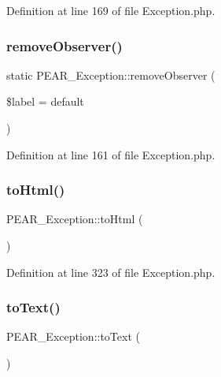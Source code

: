 Definition at line 169 of file Exception.\+php.

\mbox{\label{classPEAR__Exception_ac5a5c181030c19d81f280ab8190b5909}} 
\subsubsection{\texorpdfstring{remove\+Observer()}{removeObserver()}}
{\footnotesize\ttfamily static P\+E\+A\+R\+\_\+\+Exception\+::remove\+Observer (\begin{DoxyParamCaption}\item[{}]{\$label = {\ttfamily \textquotesingle{}default\textquotesingle{}} }\end{DoxyParamCaption})\hspace{0.3cm}{\ttfamily [static]}}



Definition at line 161 of file Exception.\+php.

\mbox{\label{classPEAR__Exception_ab69d689242e40974b2675cf25aa68068}} 
\subsubsection{\texorpdfstring{to\+Html()}{toHtml()}}
{\footnotesize\ttfamily P\+E\+A\+R\+\_\+\+Exception\+::to\+Html (\begin{DoxyParamCaption}{ }\end{DoxyParamCaption})}



Definition at line 323 of file Exception.\+php.

\mbox{\label{classPEAR__Exception_ad3b5a0285226613b02b1730b2d632bd1}} 
\subsubsection{\texorpdfstring{to\+Text()}{toText()}}
{\footnotesize\ttfamily P\+E\+A\+R\+\_\+\+Exception\+::to\+Text (\begin{DoxyParamCaption}{ }\end{DoxyParamCaption})}



